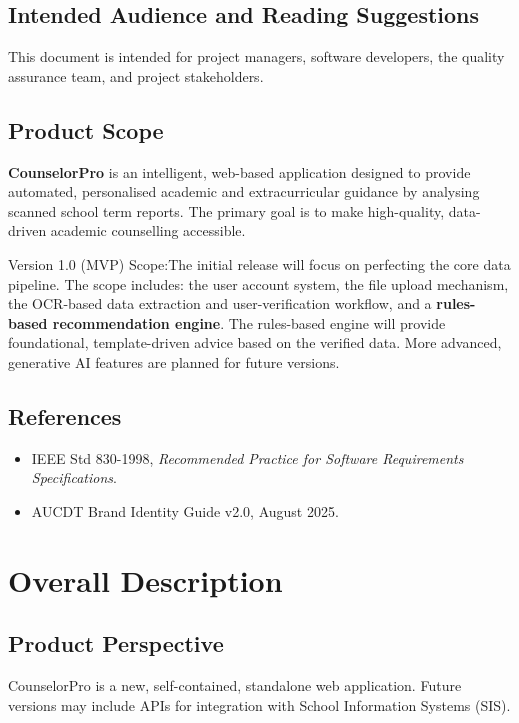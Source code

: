 \documentclass[a4paper, 11pt]{article}
\begin{document}
\subsection{Intended Audience and Reading Suggestions}
This document is intended for project managers, software developers, the quality assurance team, and project stakeholders. 

\subsection{Product Scope}
\begin{cardcontainer}[title={Product Scope}]
    \textbf{CounselorPro} is an intelligent, web-based application designed to provide automated, personalised academic and extracurricular guidance by analysing scanned school term reports. The primary goal is to make high-quality, data-driven academic counselling accessible.

    \vspace{1em}
    \poppinssemibold\color{AUCDTPrimaryText}Version 1.0 (MVP) Scope:\normalfont The initial release will focus on perfecting the core data pipeline. The scope includes: the user account system, the file upload mechanism, the OCR-based data extraction and user-verification workflow, and a \textbf{rules-based recommendation engine}. The rules-based engine will provide foundational, template-driven advice based on the verified data. More advanced, generative AI features are planned for future versions.
\end{cardcontainer}

\subsection{References}
\begin{itemize}[label={\color{AUCDTBurgundy}\faBook}]
    \item IEEE Std 830-1998, \textit{Recommended Practice for Software Requirements Specifications}.
    \item AUCDT Brand Identity Guide v2.0, August 2025.
\end{itemize}

\section{Overall Description}

\subsection{Product Perspective}
CounselorPro is a new, self-contained, standalone web application. Future versions may include APIs for integration with School Information Systems (SIS).
\end{document}
